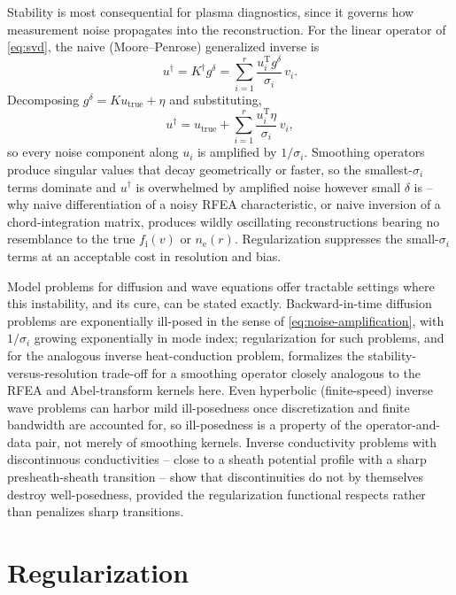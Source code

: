 Stability is most consequential for plasma diagnostics, since it governs how measurement noise propagates into the reconstruction. For the linear operator of \cref{eq:svd}, the naive (Moore--Penrose) generalized inverse is
\begin{equation}
u^{\dagger} = K^{\dagger} g^{\delta} = \sum_{i=1}^{r} \frac{u_{i}^{\mathrm{T}} g^{\delta}}{\sigma_{i}}\, v_{i}.
\label{eq:pseudoinverse}
\end{equation}
Decomposing $g^{\delta} = Ku_{\mathrm{true}} + \eta$ and substituting,
\begin{equation}
u^{\dagger} = u_{\mathrm{true}} + \sum_{i=1}^{r} \frac{u_{i}^{\mathrm{T}} \eta}{\sigma_{i}}\, v_{i},
\label{eq:noise-amplification}
\end{equation}
so every noise component along $u_i$ is amplified by $1/\sigma_i$. Smoothing operators produce singular values that decay geometrically or faster, so the smallest-$\sigma_i$ terms dominate and $u^{\dagger}$ is overwhelmed by amplified noise however small $\delta$ is -- why naive differentiation of a noisy RFEA characteristic, or naive inversion of a chord-integration matrix, produces wildly oscillating reconstructions bearing no resemblance to the true $f_{\mathrm{i}}(v)$ or $n_{\mathrm{e}}(r)$. Regularization suppresses the small-$\sigma_i$ terms at an acceptable cost in resolution and bias.

Model problems for diffusion and wave equations offer tractable settings where this instability, and its cure, can be stated exactly. Backward-in-time diffusion problems are exponentially ill-posed in the sense of \cref{eq:noise-amplification}, with $1/\sigma_i$ growing exponentially in mode index; regularization for such problems, and for the analogous inverse heat-conduction problem, formalizes the stability-versus-resolution trade-off for a smoothing operator closely analogous to the RFEA and Abel-transform kernels here. Even hyperbolic (finite-speed) inverse wave problems can harbor mild ill-posedness once discretization and finite bandwidth are accounted for, so ill-posedness is a property of the operator-and-data pair, not merely of smoothing kernels. Inverse conductivity problems with discontinuous conductivities -- close to a sheath potential profile with a sharp presheath-sheath transition -- show that discontinuities do not by themselves destroy well-posedness, provided the regularization functional respects rather than penalizes sharp transitions.

\section{Regularization}
\label{sec:regularization}

